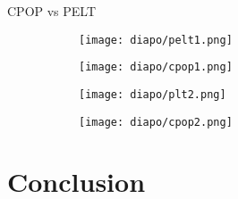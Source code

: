 \documentclass[10pt, xcolor=dvipsnames]{beamer}
\begin{document}
\begin{frame}{CPOP vs PELT}




\begin{figure}[htbp]
    \centering
    \begin{subfigure}{0.45\textwidth}
        \centering
        \texttt{[image: diapo/pelt1.png]}

        \label{fig:subfig1}
    \end{subfigure}
    \hfill
    \begin{subfigure}{0.45\textwidth}
        \centering
        \texttt{[image: diapo/cpop1.png]}

        \label{fig:subfig2}
    \end{subfigure}

    \vspace{0.5cm} %

    \begin{subfigure}{0.45\textwidth}
        \centering
        \texttt{[image: diapo/plt2.png]}

        \label{fig:subfig3}
    \end{subfigure}
    \hfill
    \begin{subfigure}{0.45\textwidth}
        \centering
        \texttt{[image: diapo/cpop2.png]}

        \label{fig:subfig4}
    \end{subfigure}

    \label{fig:gridfigure}
\end{figure}

\end{frame}

\section{Conclusion}
\end{document}
